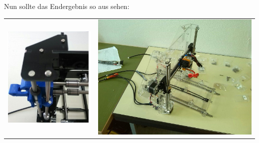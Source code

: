 Nun sollte das Endergebnis so aus sehen:\\
\begin{tabular}{cc}
\includegraphics[clip=true, trim= 0 0 30 0, height=0.55\linewidth]{Bilder/Z_Assembly_6.png} & 
\includegraphics[clip=true, trim= 200 0 150 0, height=0.55\linewidth]{Bilder/XYZ_Merge_1.jpg} \\
\end{tabular}
